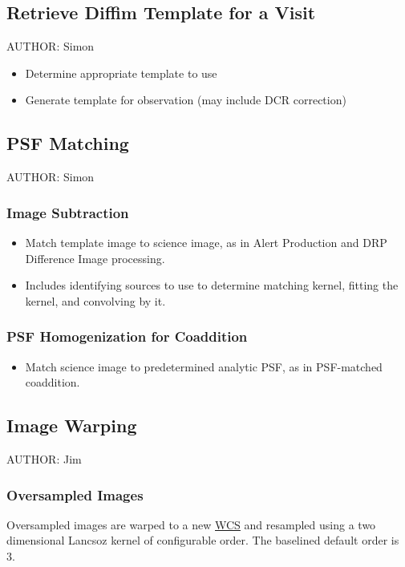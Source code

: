 \subsection{Retrieve Diffim Template for a Visit}
\label{sec:acRetrieveTemplate}
AUTHOR: Simon
\begin{itemize}
\item Determine appropriate template to use
\item Generate template for observation (may include DCR correction)
\end{itemize}

\subsection{PSF Matching}
\label{sec:acPSFMatching}
AUTHOR: Simon
\subsubsection{Image Subtraction}
\label{sec:acImageSubtraction}
\begin{itemize}
\item Match template image to science image, as in Alert Production and DRP Difference Image processing.
\item Includes identifying sources to use to determine matching kernel, fitting the kernel, and convolving by it.
\end{itemize}
\subsubsection{PSF Homogenization for Coaddition}
\label{sec:acPSFHomogenization}
\begin{itemize}
\item Match science image to predetermined analytic PSF, as in PSF-matched coaddition.
\end{itemize}

\subsection{Image Warping}
\label{sec:acWarping}
AUTHOR: Jim
\subsubsection{Oversampled Images}
\label{sec:acOversampledWarping}

Oversampled images are warped to a new \hyperref[sec:spWCS]{WCS} and resampled using a two dimensional Lancsoz kernel of configurable order. The baselined default order is 3.


